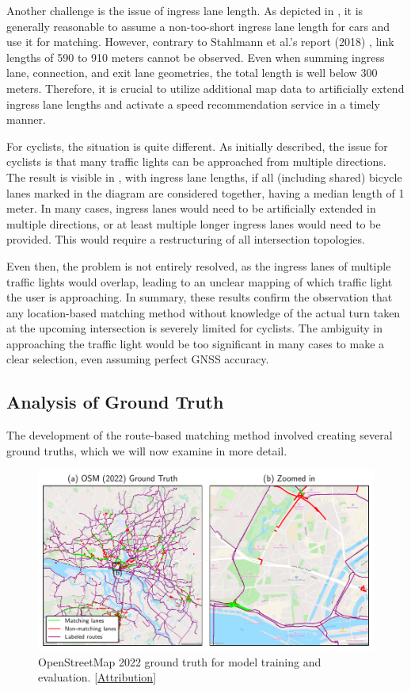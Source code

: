 Another challenge is the issue of ingress lane length. As depicted in , it is generally reasonable to assume a non-too-short ingress lane length for cars and use it for matching. However, contrary to Stahlmann et al.'s report (2018) \cite{stahlmann_exploring_2018}, link lengths of 590 to 910 meters cannot be observed. Even when summing ingress lane, connection, and exit lane geometries, the total length is well below 300 meters. Therefore, it is crucial to utilize additional map data to artificially extend ingress lane lengths and activate a speed recommendation service in a timely manner.

For cyclists, the situation is quite different. As initially described, the issue for cyclists is that many traffic lights can be approached from multiple directions. The result is visible in , with ingress lane lengths, if all (including shared) bicycle lanes marked in the diagram are considered together, having a median length of 1 meter. In many cases, ingress lanes would need to be artificially extended in multiple directions, or at least multiple longer ingress lanes would need to be provided. This would require a restructuring of all intersection topologies.

Even then, the problem is not entirely resolved, as the ingress lanes of multiple traffic lights would overlap, leading to an unclear mapping of which traffic light the user is approaching. In summary, these results confirm the observation that any location-based matching method without knowledge of the actual turn taken at the upcoming intersection is severely limited for cyclists. The ambiguity in approaching the traffic light would be too significant in many cases to make a clear selection, even assuming perfect GNSS accuracy.

\subsection{Analysis of Ground Truth}

The development of the route-based matching method involved creating several ground truths, which we will now examine in more detail.

\begin{figure}[t]
\centering 
\includegraphics[width=\linewidth]{images/matching-ground-truth-osm-old.pdf}
\caption{OpenStreetMap 2022 ground truth for model training and evaluation. [\hyperref[attribution]{Attribution}]}
\label{fig:matching-ground-truth-osm-old}
\end{figure}

